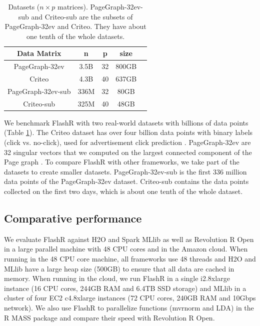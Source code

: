 \begin{table}
\begin{center}
\footnotesize
\begin{tabular}{|c|c|c|c|c|}
\hline
Data Matrix & n & p & size \\
\hline
PageGraph-32ev \cite{webgraph} & 3.5B & 32 & 800GB \\
\hline
Criteo \cite{criteo} & 4.3B & 40 & 637GB \\
\hline
PageGraph-32ev-sub \cite{webgraph} & 336M & 32 & 80GB \\
\hline
Criteo-sub \cite{criteo} & 325M & 40 & 48GB \\
\hline
\end{tabular}
\normalsize
\end{center}
\caption{Datasets ($n \times p$ matrices). PageGraph-32ev-sub and
	Criteo-sub are the subsets of PageGraph-32ev and Criteo. They
	have about one tenth of the whole datasets.}
\label{tbl:data}
\vspace{-5pt}
\end{table}

We benchmark FlashR with two real-world datasets with billions of data points
(Table \ref{tbl:data}). The Criteo dataset has over four billion data points
with binary labels (click vs. no-click), used for advertisement click
prediction \cite{criteo}. PageGraph-32ev are 32 singular vectors that we
computed on the largest connected component of the Page graph \cite{webgraph}.
To compare FlashR with other frameworks, we take part of the datasets to
create smaller datasets. PageGraph-32ev-sub is the first 336 million data points
of the PageGraph-32ev dataset. Criteo-sub contains the data points collected
on the first two days, which is about one tenth of the whole dataset.

\subsection{Comparative performance}
We evaluate FlashR against H2O \cite{h2o} and Spark MLlib \cite{mllib} as well
as Revolution R Open \cite{rro} in a large parallel machine with 48 CPU cores
and in the Amazon cloud. When running in the 48 CPU core machine, all frameworks
use 48 threads and H2O and MLlib have a large heap size (500GB) to ensure that
all data are cached in memory. When running in the cloud, we run FlashR
in a single i2.8xlarge instance (16 CPU cores, 244GB RAM and 6.4TB SSD storage)
and MLlib in a cluster of four EC2 c4.8xlarge instances (72 CPU cores, 240GB RAM
and 10Gbps network). We also use FlashR to parallelize functions (mvrnorm and LDA)
in the R MASS package and compare their speed with Revolution R Open.

